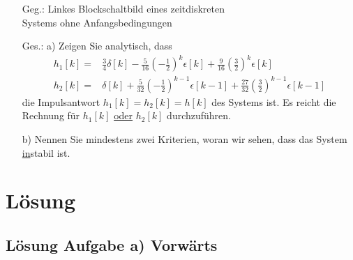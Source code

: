 \documentclass[11pt,a4paper,DIV=12]{scrartcl}
\begin{document}
%
\quad
\begin{minipage}{0.5\textwidth}
	\begin{itemize}
		\item[Geg.:] Linkes Blockschaltbild eines zeitdiskreten\\Systems ohne Anfangsbedingungen
		\item[Ges.: a)] Zeigen Sie analytisch, dass
		\begin{align*}
			h_1[k] =& \frac{3}{4} \delta[k] - \frac{5}{16}\left(-\frac{1}{2}\right)^k \epsilon[k] + \frac{9}{16}\left(\frac{3}{2}\right)^k \epsilon[k]\\
			h_2[k] =& \delta[k] + \frac{5}{32}\left(-\frac{1}{2}\right)^{k-1} \epsilon[k-1] + \frac{27}{32}\left(\frac{3}{2}\right)^{k-1} \epsilon[k-1]
		\end{align*}
		die Impulsantwort $h_1[k]=h_2[k]=h[k]$ des Systems ist.
		Es reicht die Rechnung für $h_1[k]$ \underline{oder} $h_2[k]$ durchzuführen.
		\item[      b)] Nennen Sie mindestens zwei Kriterien, woran wir sehen, dass das System \underline{in}stabil ist.
	\end{itemize}
\end{minipage}
\quad
\newpage
%
\section*{Lösung}
%
%
%
\subsection*{Lösung Aufgabe a) Vorwärts}
\end{document}
